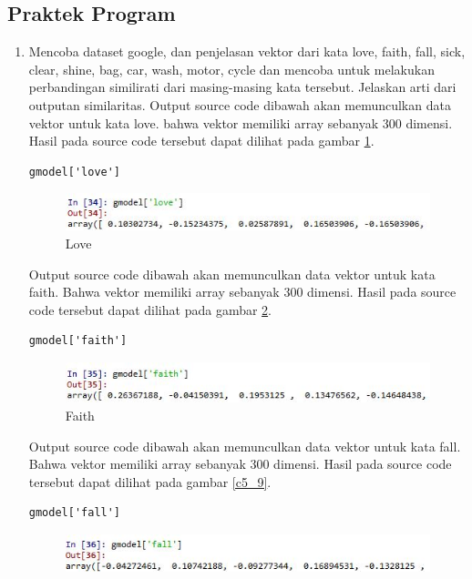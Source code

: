 \subsection{Praktek Program}
\begin{enumerate}
\item Mencoba dataset google, dan penjelasan vektor dari kata love, faith, fall, sick, clear, shine, bag, car, wash, motor, cycle dan mencoba untuk melakukan perbandingan similirati dari masing-masing kata tersebut. Jelaskan arti dari outputan similaritas.
\subitem Output source code dibawah akan memunculkan data vektor untuk kata love. bahwa vektor memiliki array sebanyak 300 dimensi. Hasil pada source code tersebut dapat dilihat pada gambar \ref{c5_7}.
\begin{verbatim}
gmodel['love']
\end{verbatim}
\begin{figure}[!htbp]
\centerline{\includegraphics[width=1\textwidth]{figures/c5p/7.JPG}}
\caption{Love}
\label{c5_7}
\end{figure}
\subitem Output source code dibawah akan memunculkan data vektor untuk kata faith. Bahwa vektor memiliki array sebanyak 300 dimensi. Hasil pada source code tersebut dapat dilihat pada gambar \ref{c5_8}.
\begin{verbatim}
gmodel['faith']
\end{verbatim}
\begin{figure}[!htbp]
\centerline{\includegraphics[width=1\textwidth]{figures/c5p/8.JPG}}
\caption{Faith}
\label{c5_8}
\end{figure}
\subitem Output source code dibawah akan memunculkan data vektor untuk kata fall. Bahwa vektor memiliki array sebanyak 300 dimensi. Hasil pada source code tersebut dapat dilihat pada gambar \ref{c5_9}.
\begin{verbatim}
gmodel['fall']
\end{verbatim}
\begin{figure}[!htbp]
\centerline{\includegraphics[width=1\textwidth]{figures/c5p/9.JPG}}

\end{figure}
\end{enumerate}
